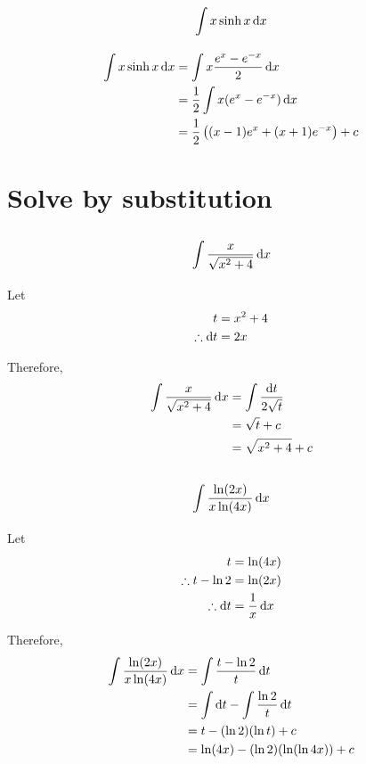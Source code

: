 \documentclass[fleqn, a4paper]{article}
\begin{document}
\subsection{\[\int x \sinh x \dif x\]}

\begin{align*}
	\int x \sinh x \dif x &= \int x \dfrac{e^x - e^{-x}}{2} \dif x\\
	&= \dfrac{1}{2} \int x (e^x - e^{-x}) \dif x\\
	&= \dfrac{1}{2} \left( (x - 1) e^x + (x + 1) e^{-x} \right) + c
\end{align*}

\section{Solve by substitution}

\subsection{\[\int \dfrac{x}{\sqrt{x^2 + 4}} \dif x\]}

Let
\begin{align*}
	t &= x^2 + 4\\
	\therefore \dif t &= 2x
\end{align*}

Therefore,
\begin{align*}
	\int \dfrac{x}{\sqrt{x^2 + 4}} \dif x &= \int \dfrac{\dif t}{2 \sqrt{t}}\\
	&= \sqrt{t} + c\\
	&= \sqrt{x^2 + 4} + c
\end{align*}

\subsection{\[\int \dfrac{\ln (2x)}{x \ln (4x)} \dif x\]}

Let
\begin{align*}
	t &= \ln (4x)\\
	\therefore t - \ln 2 &= \ln (2x)\\
	\therefore \dif t &= \dfrac{1}{x} \dif x
\end{align*}

Therefore,
\begin{align*}
	\int \dfrac{\ln (2x)}{x \ln (4x)} \dif x &= \int \dfrac{t - \ln 2}{t} \dif t\\
	&= \int \dif t - \int \dfrac{\ln 2}{t} \dif t\\
	&= t - (\ln 2)(\ln t) + c\\
	&= \ln (4x) - (\ln 2)(\ln (\ln 4x)) + c
\end{align*}
\end{document}
